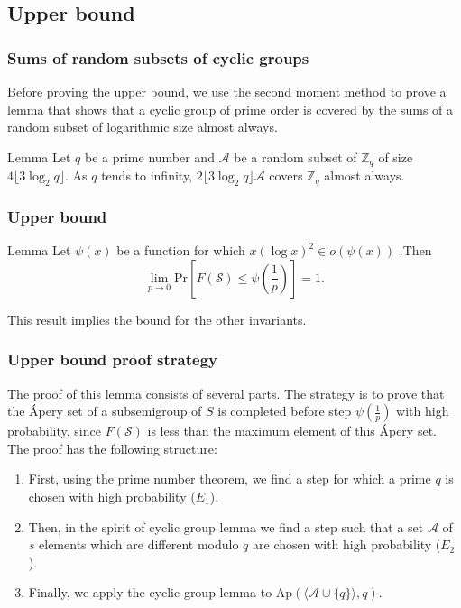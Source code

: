 \documentclass{beamer}
\def\Pr{\ensuremath{\mathrm{Pr}}}
\begin{document}


\subsection{Upper bound}

\begin{frame}
\frametitle{Sums of random subsets of cyclic groups}
Before proving the upper bound, we use the second moment method to prove a lemma that shows that a cyclic group of prime order is covered by the sums of a random subset of logarithmic size almost always. 
\begin{block}{Lemma}
    Let $q$ be a prime number and $\mathcal{A}$ be a random subset of $\mathbb{Z}_q$ of size $4\lfloor3\log_2 q\rfloor$. As $q$ tends to infinity, $2\lfloor3\log_2 q\rfloor \mathcal{A}$ covers $\mathbb{Z}_q$ almost always. 
\end{block}
\end{frame}


\begin{frame}
    \frametitle{Upper bound}
    \begin{block}{Lemma}
        Let $\psi(x)$ be a function for which $x(\log x)^2 \in o(\psi(x))$ .Then
        \[\lim_{p \to 0}\Pr\left[F(\mathcal{S}) \leq \psi\left(\frac{1}{p}\right)\right] = 1.\] 
    \end{block}
    This result implies the bound for the other invariants.
\end{frame}

\begin{frame}
    \frametitle{Upper bound proof strategy}
    The proof of this lemma consists of several parts. The strategy is to prove that the Ápery set of a subsemigroup of $S$ is completed before step $\psi\left(\frac{1}{p}\right)$ with high probability, since $F(\mathcal{S})$ is less than the maximum element of this Ápery set. The proof has the following structure: 
\begin{enumerate}
\item First, using the prime number theorem, we find a step for which a prime $q$ is chosen with high probability ($E_1$). 
\item Then, in the spirit of cyclic group lemma we find a step such that a set $\mathcal{A}$ of $s$ elements which are different modulo $q$ are chosen with high probability ($E_2$). 
\item Finally, we apply the cyclic group lemma to $\mathrm{Ap}(\langle \mathcal{A} \cup \{q\}\rangle, q)$.
\end{enumerate}
    
\end{frame}
\end{document}
